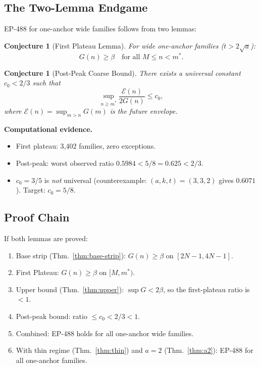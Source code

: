 \documentclass[11pt,a4paper]{article}
\newtheorem{conjecture}[theorem]{Conjecture}
\theoremstyle{definition}
\begin{document}
\subsection{The Two-Lemma Endgame}

EP-488 for one-anchor wide families follows from two lemmas:

\begin{conjecture}[First Plateau Lemma]\label{conj:plateau}
For wide one-anchor families ($t > 2\sqrt{a}$):
\[
G(n) \geq \beta \quad \text{for all } M \leq n < m^*.
\]
\end{conjecture}

\begin{conjecture}[Post-Peak Coarse Bound]\label{conj:postpeak}
There exists a universal constant $c_0 < 2/3$ such that
\[
\sup_{n \geq m^*} \frac{\mathcal{E}(n)}{2G(n)} \leq c_0,
\]
where $\mathcal{E}(n) = \sup_{m>n} G(m)$ is the future envelope.
\end{conjecture}

\textbf{Computational evidence.}
\begin{itemize}
\item First plateau: 3{,}402 families, zero exceptions.
\item Post-peak: worst observed ratio $0.5984 < 5/8 = 0.625 < 2/3$.
\item $c_0 = 3/5$ is \emph{not} universal (counterexample: 
$(a,k,t) = (3,3,2)$ gives $0.6071$). Target: $c_0 = 5/8$.
\end{itemize}

\subsection{Proof Chain}

If both lemmas are proved:
\begin{enumerate}
\item Base strip (Thm.~\ref{thm:base-strip}): $G(n) \geq \beta$ on 
$[2N-1, 4N-1]$.
\item First Plateau: $G(n) \geq \beta$ on $[M, m^*)$.
\item Upper bound (Thm.~\ref{thm:upper}): 
$\sup G < 2\beta$, so the first-plateau ratio is $< 1$.
\item Post-peak bound: ratio $\leq c_0 < 2/3 < 1$.
\item Combined: EP-488 holds for all one-anchor wide families.
\item With thin regime (Thm.~\ref{thm:thin}) and $a=2$ 
(Thm.~\ref{thm:a2}): EP-488 for all one-anchor families.
\end{enumerate}
\end{document}
